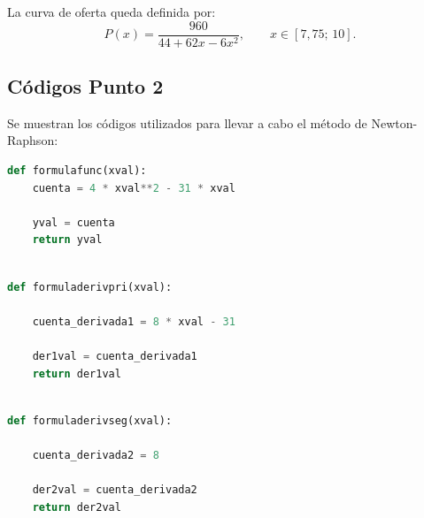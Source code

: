 La curva de oferta queda definida por:
\begin{equation}
    P(x) = \frac{960}{44 + 62x - 6x^2}, \qquad x \in [7{,}75;\,10].
\end{equation}


\subsection{Códigos Punto 2}
Se muestran los códigos utilizados para llevar a cabo el método de Newton-Raphson:

\begin{lstlisting}[language=Python,frame=single,caption= Función cuya raíz desea calcularse,label={cod:yval1}]
def formulafunc(xval):
    cuenta = 4 * xval**2 - 31 * xval
  
    yval = cuenta
    return yval
\end{lstlisting}

\begin{lstlisting}[language=Python,frame=single,caption= Derivada primera,label={cod:der1val1}]

def formuladerivpri(xval):
   
    cuenta_derivada1 = 8 * xval - 31
    
    der1val = cuenta_derivada1
    return der1val
  
\end{lstlisting}


\begin{lstlisting}[language=Python,frame=single,caption=Derivada segunda ,label={cod:der2val1}]
def formuladerivseg(xval):
   
    cuenta_derivada2 = 8
    
    der2val = cuenta_derivada2
    return der2val
\end{lstlisting}

